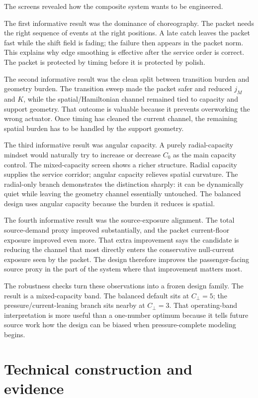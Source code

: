 \documentclass[11pt]{article}
\begin{document}
The screens revealed how the composite system wants to be engineered.

The first informative result was the dominance of choreography. The packet needs the right sequence of events at the right positions. A late catch leaves the packet fast while the shift field is fading; the failure then appears in the packet norm. This explains why edge smoothing is effective after the service order is correct. The packet is protected by timing before it is protected by polish.

The second informative result was the clean split between transition burden and geometry burden. The transition sweep made the packet safer and reduced $j_M$ and $K$, while the spatial/Hamiltonian channel remained tied to capacity and support geometry. That outcome is valuable because it prevents overworking the wrong actuator. Once timing has cleaned the current channel, the remaining spatial burden has to be handled by the support geometry.

The third informative result was angular capacity. A purely radial-capacity mindset would naturally try to increase or decrease $C_0$ as the main capacity control. The mixed-capacity screen shows a richer structure. Radial capacity supplies the service corridor; angular capacity relieves spatial curvature. The radial-only branch demonstrates the distinction sharply: it can be dynamically quiet while leaving the geometry channel essentially untouched. The balanced design uses angular capacity because the burden it reduces is spatial.

The fourth informative result was the source-exposure alignment. The total source-demand proxy improved substantially, and the packet current-floor exposure improved even more. That extra improvement says the candidate is reducing the channel that most directly enters the conservative null-current exposure seen by the packet. The design therefore improves the passenger-facing source proxy in the part of the system where that improvement matters most.

The robustness checks turn these observations into a frozen design family. The result is a mixed-capacity band. The balanced default sits at $C_\perp=5$; the pressure/current-leaning branch sits nearby at $C_\perp=3$. That operating-band interpretation is more useful than a one-number optimum because it tells future source work how the design can be biased when pressure-complete modeling begins.

\section{Technical construction and evidence}
\label{sec:technical}
\end{document}
